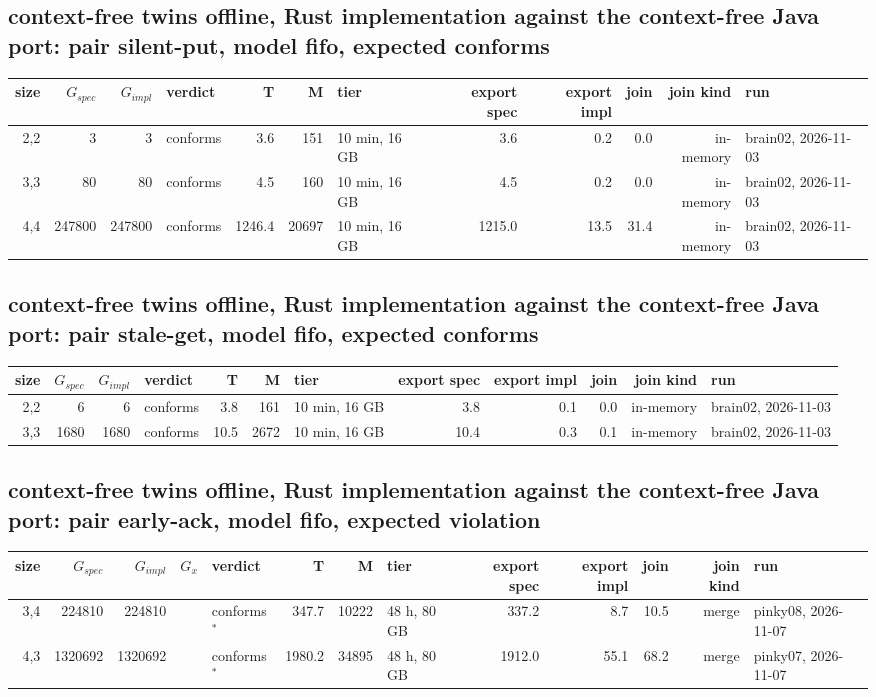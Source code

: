 \documentclass[10pt]{article}
\begin{document}
\subsection*{context-free twins offline, Rust implementation against the context-free Java port: pair \textsf{silent-put}, model fifo, expected conforms}
\begin{longtable}{@{}rrrlrrlrrrrl@{}}
\toprule
size & $G_{\mathit{spec}}$ & $G_{\mathit{impl}}$ & verdict & T & M & tier & export spec & export impl & join & join kind & run \\
\midrule
\endhead
\color{red} 2,2 & 3 & 3 & conforms & 3.6 & 151 & 10 min, 16 GB & 3.6 & 0.2 & 0.0 & in-memory & brain02, 2026-11-03 \\
\color{red} 3,3 & 80 & 80 & conforms & 4.5 & 160 & 10 min, 16 GB & 4.5 & 0.2 & 0.0 & in-memory & brain02, 2026-11-03 \\
\color{red} 4,4 & 247800 & 247800 & conforms & 1246.4 & 20697 & 10 min, 16 GB & 1215.0 & 13.5 & 31.4 & in-memory & brain02, 2026-11-03 \\
\bottomrule
\end{longtable}
\subsection*{context-free twins offline, Rust implementation against the context-free Java port: pair \textsf{stale-get}, model fifo, expected conforms}
\begin{longtable}{@{}rrrlrrlrrrrl@{}}
\toprule
size & $G_{\mathit{spec}}$ & $G_{\mathit{impl}}$ & verdict & T & M & tier & export spec & export impl & join & join kind & run \\
\midrule
\endhead
\color{red} 2,2 & 6 & 6 & conforms & 3.8 & 161 & 10 min, 16 GB & 3.8 & 0.1 & 0.0 & in-memory & brain02, 2026-11-03 \\
\color{red} 3,3 & 1680 & 1680 & conforms & 10.5 & 2672 & 10 min, 16 GB & 10.4 & 0.3 & 0.1 & in-memory & brain02, 2026-11-03 \\
\bottomrule
\end{longtable}
\subsection*{context-free twins offline, Rust implementation against the context-free Java port: pair \textsf{early-ack}, model fifo, expected violation}
\begin{longtable}{@{}rrrrlrrlrrrrl@{}}
\toprule
size & $G_{\mathit{spec}}$ & $G_{\mathit{impl}}$ & $G_x$ & verdict & T & M & tier & export spec & export impl & join & join kind & run \\
\midrule
\endhead
\color{red} 3,4 & 224810 & 224810 &  & conforms$^{\ast}$ & 347.7 & 10222 & 48 h, 80 GB & 337.2 & 8.7 & 10.5 & merge & pinky08, 2026-11-07 \\
\color{red} 4,3 & 1320692 & 1320692 &  & conforms$^{\ast}$ & 1980.2 & 34895 & 48 h, 80 GB & 1912.0 & 55.1 & 68.2 & merge & pinky07, 2026-11-07 \\
\bottomrule
\end{longtable}
\end{document}
